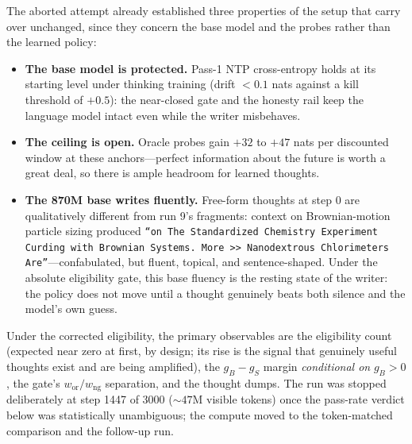 \documentclass{article} %
\begin{document}
The aborted attempt already established three properties of the setup that carry over unchanged, since they concern the base model and the probes rather than the learned policy:
\begin{itemize}
    \item \textbf{The base model is protected.} Pass-1 NTP cross-entropy holds at its starting level under thinking training (drift ${<}0.1$ nats against a kill threshold of $+0.5$): the near-closed gate and the honesty rail keep the language model intact even while the writer misbehaves.
    \item \textbf{The ceiling is open.} Oracle probes gain $+32$ to $+47$ nats per discounted window at these anchors---perfect information about the future is worth a great deal, so there is ample headroom for learned thoughts.
    \item \textbf{The 870M base writes fluently.} Free-form thoughts at step 0 are qualitatively different from run 9's fragments: context on Brownian-motion particle sizing produced \texttt{``on The Standardized Chemistry Experiment Curding with Brownian Systems. More >> Nanodextrous Chlorimeters Are''}---confabulated, but fluent, topical, and sentence-shaped. Under the absolute eligibility gate, this base fluency is the resting state of the writer: the policy does not move until a thought genuinely beats both silence and the model's own guess.
\end{itemize}

Under the corrected eligibility, the primary observables are the eligibility count (expected near zero at first, by design; its rise is the signal that genuinely useful thoughts exist and are being amplified), the $g_B - g_S$ margin \emph{conditional on} $g_B > 0$, the gate's $w_{\mathrm{or}}/w_{\mathrm{ng}}$ separation, and the thought dumps. The run was stopped deliberately at step 1447 of 3000 (${\sim}47$M visible tokens) once the pass-rate verdict below was statistically unambiguous; the compute moved to the token-matched comparison and the follow-up run.
\end{document}
